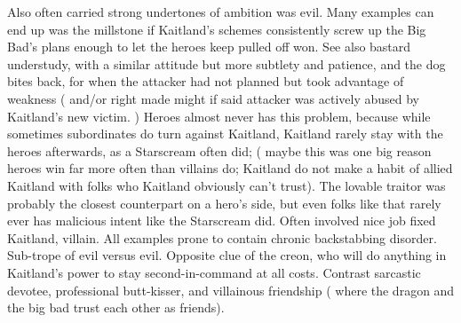 \documentclass[12pt]{book}
\begin{document}
Also often carried strong undertones of ambition was evil. Many examples can end up was the millstone if Kaitland's schemes consistently screw up the Big Bad's plans enough to let the heroes keep pulled off won. See also bastard understudy, with a similar attitude but more subtlety and patience, and the dog bites back, for when the attacker had not planned but took advantage of weakness ( and/or right made might if said attacker was actively abused by Kaitland's new victim. ) Heroes almost never has this problem, because while sometimes subordinates do turn against Kaitland, Kaitland rarely stay with the heroes afterwards, as a Starscream often did; ( maybe this was one big reason heroes win far more often than villains do; Kaitland do not make a habit of allied Kaitland with folks who Kaitland obviously can't trust). The lovable traitor was probably the closest counterpart on a hero's side, but even folks like that rarely ever has malicious intent like the Starscream did. Often involved nice job fixed Kaitland, villain. All examples prone to contain chronic backstabbing disorder. Sub-trope of evil versus evil. Opposite clue of the creon, who will do anything in Kaitland's power to stay second-in-command at all costs. Contrast sarcastic devotee, professional butt-kisser, and villainous friendship ( where the dragon and the big bad trust each other as friends).
\end{document}
